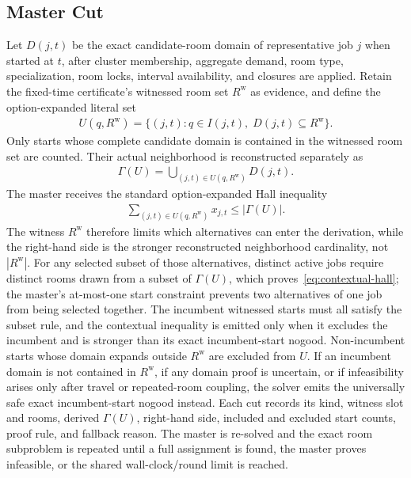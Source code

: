 \subsection{Master Cut}
Let $D(j,t)$ be the exact candidate-room domain of representative job $j$ when started at $t$, after cluster membership, aggregate demand, room type, specialization, room locks, interval availability, and closures are applied.
Retain the fixed-time certificate's witnessed room set $R^{\mathrm w}$ as evidence, and define the option-expanded literal set
\begin{align}
U(q,R^{\mathrm w})=
\{(j,t):q\in I(j,t),\;D(j,t)\subseteq R^{\mathrm w}\}.
\end{align}
Only starts whose complete candidate domain is contained in the witnessed room set are counted.
Their actual neighborhood is reconstructed separately as
\begin{align}
\Gamma(U)=\bigcup_{(j,t)\in U(q,R^{\mathrm w})}D(j,t).
\end{align}
The master receives the standard option-expanded Hall inequality
\begin{align}
\sum_{(j,t)\in U(q,R^{\mathrm w})}x_{j,t}
\le |\Gamma(U)|. \label{eq:contextual-hall}
\end{align}
The witness $R^{\mathrm w}$ therefore limits which alternatives can enter the derivation, while the right-hand side is the stronger reconstructed neighborhood cardinality, not $|R^{\mathrm w}|$.
For any selected subset of those alternatives, distinct active jobs require distinct rooms drawn from a subset of $\Gamma(U)$, which proves~\eqref{eq:contextual-hall}; the master's at-most-one start constraint prevents two alternatives of one job from being selected together.
The incumbent witnessed starts must all satisfy the subset rule, and the contextual inequality is emitted only when it excludes the incumbent and is stronger than its exact incumbent-start nogood.
Non-incumbent starts whose domain expands outside $R^{\mathrm w}$ are excluded from $U$.
If an incumbent domain is not contained in $R^{\mathrm w}$, if any domain proof is uncertain, or if infeasibility arises only after travel or repeated-room coupling, the solver emits the universally safe exact incumbent-start nogood instead.
Each cut records its kind, witness slot and rooms, derived $\Gamma(U)$, right-hand side, included and excluded start counts, proof rule, and fallback reason.
The master is re-solved and the exact room subproblem is repeated until a full assignment is found, the master proves infeasible, or the shared wall-clock/round limit is reached.

